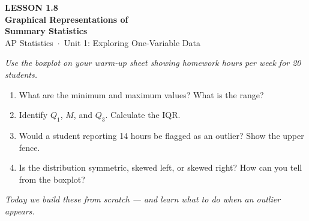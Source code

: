 \documentclass[aspectratio=169, 11pt]{beamer}
\begin{document}
{
\begin{frame}[plain]
  \vspace{2.8cm}
  \hspace{0.55cm}%
  \begin{minipage}{0.9\textwidth}
    {\color{goldacc}\bfseries\small LESSON 1.8}\\[0.5cm]
    {\color{white}\bfseries\LARGE Graphical Representations of\\[0.25cm]
      Summary Statistics}\\[1.4cm]
    {\color{skymid}\small AP Statistics~$\cdot$~Unit 1: Exploring One-Variable Data}
  \end{minipage}
\end{frame}
}

{
\begin{frame}[t, plain]
  \vspace{1em}%
  \hspace{0.55cm}%
  \begin{minipage}{0.9\textwidth}
    \small
    \textit{Use the boxplot on your warm-up sheet showing homework hours per week
    for 20 students.}

    \vspace{0.5em}
    \begin{enumerate}
      \setlength{\itemsep}{0.6em}\setlength{\topsep}{0em}
      \item What are the minimum and maximum values? What is the range?
      \item Identify $Q_1$, $M$, and $Q_3$. Calculate the IQR.
      \item Would a student reporting 14 hours be flagged as an outlier?
            Show the upper fence.
      \item Is the distribution symmetric, skewed left, or skewed right?
            How can you tell from the boxplot?
    \end{enumerate}
    \vspace{0.4cm}
    {\color{navy}\itshape\small
      Today we build these from scratch --- and learn what to do when an
      outlier appears.}
  \end{minipage}
\end{frame}
}
\end{document}
